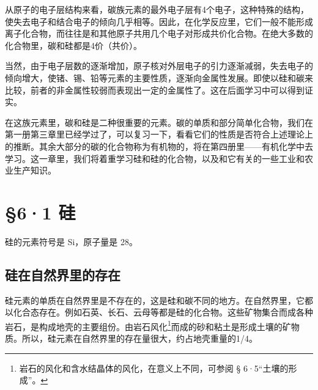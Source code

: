 {\centering
\small\setlength{\tabcolsep}{3pt}%
\par
}

从原子的电子层结构来看，碳族元素的最外电子层有4个电子，这种特殊的结构，使失去电子和结合电子的倾向几乎相等。因此，在化学反应里，它们一般不能形成离子化合物，而往往是和其他原子共用几个电子对形成共价化合物。在绝大多数的化合物里，碳和硅都是4价（共价）。

当然，由于电子层数的逐渐增加，原子核对外层电子的引力逐渐减弱，失去电子的倾向增大，使锗、锡、铅等元素的主要性质，逐渐向金属性发展。即使以硅和碳来比较，前者的非金属性较弱而表现出一定的金属性了。这在后面学习中可以得到证实。

在这族元素里，碳和硅是二种很重要的元素。碳的单质和部分简单化合物，我们在第一册第三章里已经学过了，可以复习一下，看看它们的性质是否符合上述理论上的推断。其余大部分的碳的化合物称为有机物的，将在第四册里------有机化学中去学习。这一章里，我们将着重学习硅和硅的化合物，以及和它有关的一些工业和农业生产知识。

\section{§6·1 硅}

硅的元素符号是 Si，原子量是 28。

\subsection{硅在自然界里的存在}

硅元素的单质在自然界里是不存在的，这是硅和碳不同的地方。在自然界里，它都以化合态存在。例如石英、长石、云母等都是硅的化合物。这些矿物集合而成各种岩石，是构成地壳的主要组份。由岩石风化\footnote{岩石的风化和含水结晶体的风化，在意义上不同，可参阅
  § 6·5``土壤的形成''。}而成的砂和粘土是形成土壤的矿物质。所以，硅元素在自然界里的存在量很大，约占地壳重量的1/4。

